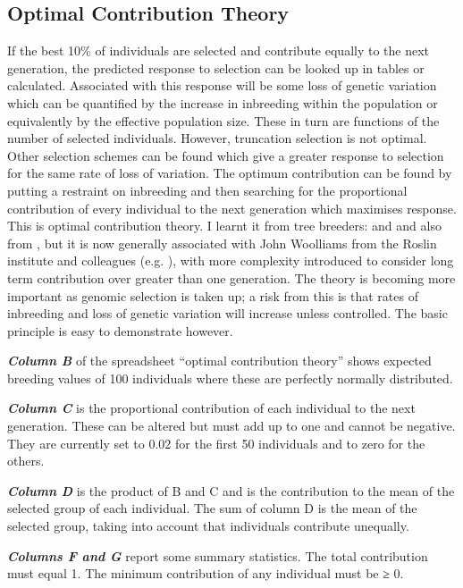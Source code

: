 \documentclass[
]{book}
\begin{document}
\hypertarget{optimal-contribution-theory}{%
\subsection{Optimal Contribution Theory}\label{optimal-contribution-theory}}

If the best 10\% of individuals are selected and contribute equally to the next generation, the predicted response to selection can be looked up in tables or calculated. Associated with this response will be some loss of genetic variation which can be quantified by the increase in inbreeding within the population or equivalently by the effective population size. These in turn are functions of the number of selected individuals. However, truncation selection is not optimal. Other selection schemes can be found which give a greater response to selection for the same rate of loss of variation. The optimum contribution can be found by putting a restraint on inbreeding and then searching for the proportional contribution of every individual to the next generation which maximises response. This is optimal contribution theory. I learnt it from tree breeders: \citet{lindgren_deployment_1989} and \citet{lindgren_optimal_1993} and also from \citet{toro_simple_1984}, but it is now generally associated with John Woolliams from the Roslin institute and colleagues (e.g. \citet{woolliams_genetic_2015}), with more complexity introduced to consider long term contribution over greater than one generation. The theory is becoming more important as genomic selection is taken up; a risk from this is that rates of inbreeding and loss of genetic variation will increase unless controlled. The basic principle is easy to demonstrate however.

\textbf{\emph{Column B}} of the spreadsheet ``optimal contribution theory'' shows expected breeding values of 100 individuals where these are perfectly normally distributed.

\textbf{\emph{Column C}} is the proportional contribution of each individual to the next generation. These can be altered but must add up to one and cannot be negative. They are currently set to 0.02 for the first 50 individuals and to zero for the others.

\textbf{\emph{Column D}} is the product of B and C and is the contribution to the mean of the selected group of each individual. The sum of column D is the mean of the selected group, taking into account that individuals contribute unequally.

\textbf{\emph{Columns F and G}} report some summary statistics. The total contribution must equal 1. The minimum contribution of any individual must be ≥ 0.
\end{document}

